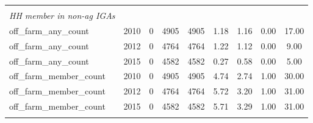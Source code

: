 \documentclass[a4paper,11pt]{article}
\begin{document}
\begin{table}[htbp]
{\begin{tabular}{lcccccccc}
        & & & & & & & & \\
    \textit{HH member in non-ag IGAs}  & & &  &  & & & \\ 

     off\_farm\_any\_count & 2010  & 0     & 4905  & 4905  & 1.18  & 1.16  & 0.00  & 17.00 \\
    off\_farm\_any\_count & 2012  & 0     & 4764  & 4764  & 1.22  & 1.12  & 0.00  & 9.00 \\
    off\_farm\_any\_count & 2015  & 0     & 4582  & 4582  & 0.27  & 0.58  & 0.00  & 5.00 \\
    
   off\_farm\_member\_count & 2010  & 0     & 4905  & 4905  & 4.74  & 2.74  & 1.00  & 30.00 \\
    off\_farm\_member\_count & 2012  & 0     & 4764  & 4764  & 5.72  & 3.20  & 1.00  & 31.00 \\
    off\_farm\_member\_count & 2015  & 0     & 4582  & 4582  & 5.71  & 3.29  & 1.00  & 31.00 \\

    \hline \\[-1.8ex] 

    \end{tabular}}%
  \label{tab:addlabel}%
\end{table}%
\end{document}
